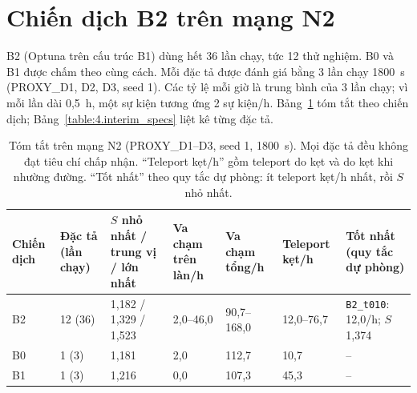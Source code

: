 \documentclass[../main.tex]{subfiles}
\begin{document}
\section{Chiến dịch B2 trên mạng N2}
\label{subsection:interim}

B2 (Optuna trên cấu trúc B1) dùng hết 36 lần chạy, tức 12 thử nghiệm. B0 và B1 được chấm theo cùng cách. Mỗi đặc tả được đánh giá bằng 3 lần chạy 1800~s (PROXY\_D1, D2, D3, seed 1). Các tỷ lệ mỗi giờ là trung bình của 3 lần chạy; vì mỗi lần dài 0,5~h, một sự kiện tương ứng 2 sự kiện/h. Bảng~\ref{table:4.interim_summary} tóm tắt theo chiến dịch; Bảng~\ref{table:4.interim_specs} liệt kê từng đặc tả.

\begin{table}[!htbp]
\centering
\small\setlength{\tabcolsep}{3pt}
\caption{Tóm tắt trên mạng N2 (PROXY\_D1--D3, seed 1, 1800~s). Mọi đặc tả đều không đạt tiêu chí chấp nhận. ``Teleport kẹt/h'' gồm teleport do kẹt và do kẹt khi nhường đường. ``Tốt nhất'' theo quy tắc dự phòng: ít teleport kẹt/h nhất, rồi $S$ nhỏ nhất.} \label{table:4.interim_summary}
\begin{tabular}{|p{1.5cm}|p{1.5cm}|p{2.6cm}|p{1.5cm}|p{1.7cm}|p{1.5cm}|>{\raggedright\arraybackslash}p{2.6cm}|}
\hline
\textbf{Chiến dịch} & \textbf{Đặc tả (lần chạy)} & \textbf{$S$ nhỏ nhất / trung vị / lớn nhất} & \textbf{Va chạm trên làn/h} & \textbf{Va chạm tổng/h} & \textbf{Teleport kẹt/h} & \textbf{Tốt nhất (quy tắc dự phòng)} \\ \hline
B2 & 12 (36) & 1,182 / 1,329 / 1,523 & 2,0--46,0 & 90,7--168,0 & 12,0--76,7 & \texttt{B2\_\allowbreak t010}: 12,0/h; $S$ 1,374 \\ \hline
B0 & 1 (3) & 1,181 & 2,0 & 112,7 & 10,7 & -- \\ \hline
B1 & 1 (3) & 1,216 & 0,0 & 107,3 & 45,3 & -- \\ \hline
\end{tabular}
\end{table}
\end{document}

